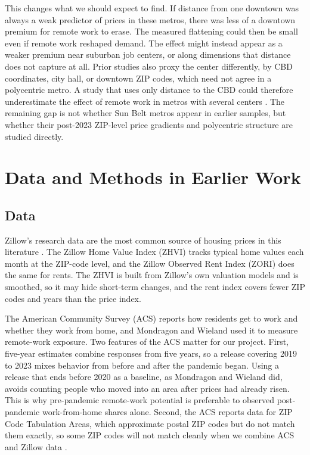 \documentclass[11pt]{article}
\begin{document}
This changes what we should expect to find. If distance from one downtown was always a weak predictor of prices in these metros, there was less of a downtown premium for remote work to erase. The measured flattening could then be small even if remote work reshaped demand. The effect might instead appear as a weaker premium near suburban job centers, or along dimensions that distance does not capture at all. Prior studies also proxy the center differently, by CBD coordinates, city hall, or downtown ZIP codes, which need not agree in a polycentric metro. A study that uses only distance to the CBD could therefore underestimate the effect of remote work in metros with several centers \cite{waddell1993residential,leslie2010identification}. The remaining gap is not whether Sun Belt metros appear in earlier samples, but whether their post-2023 ZIP-level price gradients and polycentric structure are studied directly.

\section{Data and Methods in Earlier Work}

\subsection{Data}

Zillow's research data \cite{zillow2026data} are the most common source of housing prices in this literature \cite{ramani2021donut,gupta2022flattening,mondragon2022housing,ramani2024reshapes}. The Zillow Home Value Index (ZHVI) tracks typical home values each month at the ZIP-code level, and the Zillow Observed Rent Index (ZORI) does the same for rents. The ZHVI is built from Zillow's own valuation models and is smoothed, so it may hide short-term changes, and the rent index covers fewer ZIP codes and years than the price index.

The American Community Survey (ACS) \cite{census2026acs} reports how residents get to work and whether they work from home, and Mondragon and Wieland \cite{mondragon2022housing} used it to measure remote-work exposure. Two features of the ACS matter for our project. First, five-year estimates combine responses from five years, so a release covering 2019 to 2023 mixes behavior from before and after the pandemic began. Using a release that ends before 2020 as a baseline, as Mondragon and Wieland \cite{mondragon2022housing} did, avoids counting people who moved into an area after prices had already risen. This is why pre-pandemic remote-work potential is preferable to observed post-pandemic work-from-home shares alone. Second, the ACS reports data for ZIP Code Tabulation Areas, which approximate postal ZIP codes but do not match them exactly, so some ZIP codes will not match cleanly when we combine ACS and Zillow data \cite{census2026acs}.
\end{document}
